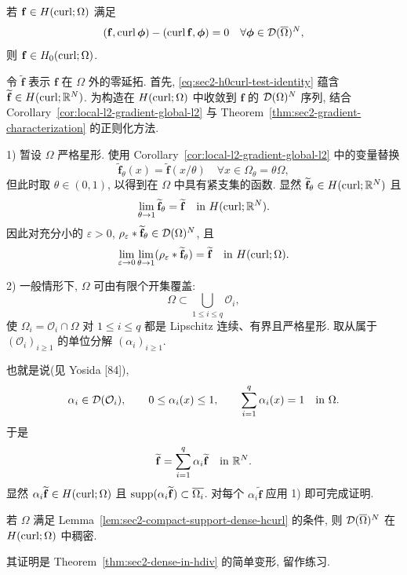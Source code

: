 \setcounter{statement}{3}
\begin{Lemma}\label{lem:sec2-h0curl-characterization-test}
若 $\mathbf f\in H(\operatorname{curl};\Omega)$ 满足
\begin{equation}\label{eq:sec2-h0curl-test-identity}
  (\mathbf f,\operatorname{curl}\boldsymbol\phi)-(\operatorname{curl}\mathbf f,\boldsymbol\phi)=0
  \quad\forall\boldsymbol\phi\in\mathcal{D}(\overline\Omega)^N,
\end{equation}
则 $\mathbf f\in H_0(\operatorname{curl};\Omega)$.
\end{Lemma}
\begin{Proof}
令 $\widetilde{\mathbf f}$ 表示 $\mathbf f$ 在 $\Omega$ 外的零延拓. 首先,
\eqref{eq:sec2-h0curl-test-identity} 蕴含
$\widetilde{\mathbf f}\in H(\operatorname{curl};\mathbb{R}^N)$. 为构造在
$H(\operatorname{curl};\Omega)$ 中收敛到 $\mathbf f$ 的 $\mathcal{D}(\Omega)^N$ 序列,
结合 Corollary~\ref{cor:local-l2-gradient-global-l2} 与
Theorem~\ref{thm:sec2-gradient-characterization} 的正则化方法.

1) 暂设 $\Omega$ 严格星形. 使用 Corollary~\ref{cor:local-l2-gradient-global-l2}
中的变量替换
\[
  \widetilde{\mathbf f}_\theta(x)=\widetilde{\mathbf f}(x/\theta)
  \quad\forall x\in\Omega_\theta=\theta\Omega,
\]
但此时取 $\theta\in(0,1)$, 以得到在 $\Omega$ 中具有紧支集的函数. 显然
$\widetilde{\mathbf f}_\theta\in H(\operatorname{curl};\mathbb{R}^N)$ 且
\[
  \lim_{\theta\to1}\widetilde{\mathbf f}_\theta
  =\widetilde{\mathbf f}\quad\text{in }H(\operatorname{curl};\mathbb{R}^N).
\]
因此对充分小的 $\varepsilon>0$,
$\rho_\varepsilon*\widetilde{\mathbf f}_\theta\in\mathcal{D}(\Omega)^N$, 且
\[
  \lim_{\varepsilon\to0}\lim_{\theta\to1}
  (\rho_\varepsilon*\widetilde{\mathbf f}_\theta)
  =\widetilde{\mathbf f}\quad\text{in }H(\operatorname{curl};\Omega).
\]

2) 一般情形下, $\Omega$ 可由有限个开集覆盖:
\[
  \Omega\subset\bigcup_{1\le i\le q}\mathcal O_i,
\]
使 $\Omega_i=\mathcal O_i\cap\Omega$ 对 $1\le i\le q$ 都是 Lipschitz 连续、有界且严格星形.
取从属于 $(\mathcal O_i)_{i\ge1}$ 的单位分解 $(\alpha_i)_{i\ge1}$.

也就是说(见 Yosida [84]),
\[
  \alpha_i\in\mathcal{D}(\mathcal O_i),\qquad 0\le\alpha_i(x)\le1,
  \qquad\sum_{i=1}^{q}\alpha_i(x)=1\quad\text{in }\Omega.
\]
于是
\[
  \widetilde{\mathbf f}=\sum_{i=1}^{q}\alpha_i\widetilde{\mathbf f}
  \quad\text{in }\mathbb{R}^N.
\]
显然 $\alpha_i\widetilde{\mathbf f}\in H(\operatorname{curl};\Omega)$ 且
$\operatorname{supp}(\alpha_i\widetilde{\mathbf f})\subset\overline{\Omega_i}$.
对每个 $\alpha_i\widetilde{\mathbf f}$ 应用 1) 即可完成证明.
\end{Proof}

\setcounter{statement}{9}
\begin{Theorem}\label{thm:sec2-dense-in-hcurl}
若 $\Omega$ 满足 Lemma~\ref{lem:sec2-compact-support-dense-hcurl} 的条件, 则
$\mathcal{D}(\overline\Omega)^N$ 在 $H(\operatorname{curl};\Omega)$ 中稠密.
\end{Theorem}
其证明是 Theorem~\ref{thm:sec2-dense-in-hdiv} 的简单变形, 留作练习.

